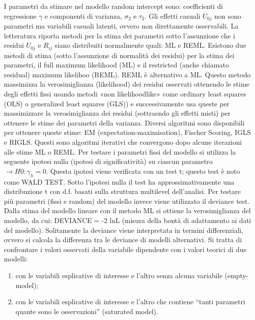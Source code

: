 \documentclass[a4page, 11pt]{article}
\begin{document}
I parametri da stimare nel modello random intercept sono: coefficienti di regressione $\gamma$ e componenti di varianza, $\sigma_2$ e $\tau_2$. Gli effetti casuali $U_{0j}$ non sono parametri ma variabili casuali latenti, ovvero non direttamente osservabili. La letteratura riporta metodi per la stima dei parametri sotto l’assunzione che i residui $U_{0j}$ e $R_{ij}$ siano distribuiti normalmente quali: ML e REML. Esistono due metodi di stima (sotto l’assunzione di normalità dei residui) per la stima dei parametri, il full maximum likelihood (ML) e il restricted (anche chiamato residual) maximum likelihoo (REML).
\newline
REML è alternativo a ML. Questo metodo massimizza la verosimiglianza (likelihood) dei residui osservati ottenendo le stime degli effetti fissi usando metodi «non likelihoodlike» come ordinary least squares (OLS) o generalized least squares (GLS)) e successivamente usa queste per massimizzare la verosimiglianza dei residui (sottraendo gli effetti misti) per ottenere le stime dei parametri della varianza. Diversi algoritmi sono disponibili per ottenere queste stime: EM (expectation-maximisation), Fischer Scoring, IGLS e RIGLS. Questi sono algoritmi iterativi che convergono dopo alcune iterazioni alle stime ML o REML.
Per testare i parametri fissi del modello si utilizza la seguente ipotesi nulla (ipotesi di significatività) su ciascun parametro $\rightarrow H0: \gamma_h = 0$.
\newline
Questa ipotesi viene verificata con un test t; questo test è noto come WALD TEST. Sotto l’ipotesi nulla il test ha approssimativamente una distribuzione t con d.f. basati sulla struttura multilevel dell’analisi. Per testare più parametri (fissi e random) del modello invece viene utilizzato il deviance test. Dalla stima del modello lineare con il metodo ML si ottiene la verosimiglianza del modello, da cui: DEVIANCE = -2 lnL (misura della bontà di adattamento ai dati del modello).
\newline
Solitamente la deviance viene interpretata in termini differenziali, ovvero si calcola la differenza tra le deviance di modelli alternativi. Si tratta di confrontare i valori osservati della variabile dipendente con i valori teorici di due modelli: 
\begin{enumerate}[noitemsep]
\item con le variabili esplicative di interesse e l’altro senza alcuna variabile (empty-model); 
\item con le variabili esplicative di interesse e l’altro che contiene “tanti parametri quante sono le osservazioni” (saturated model).
\end{enumerate}
\end{document}
